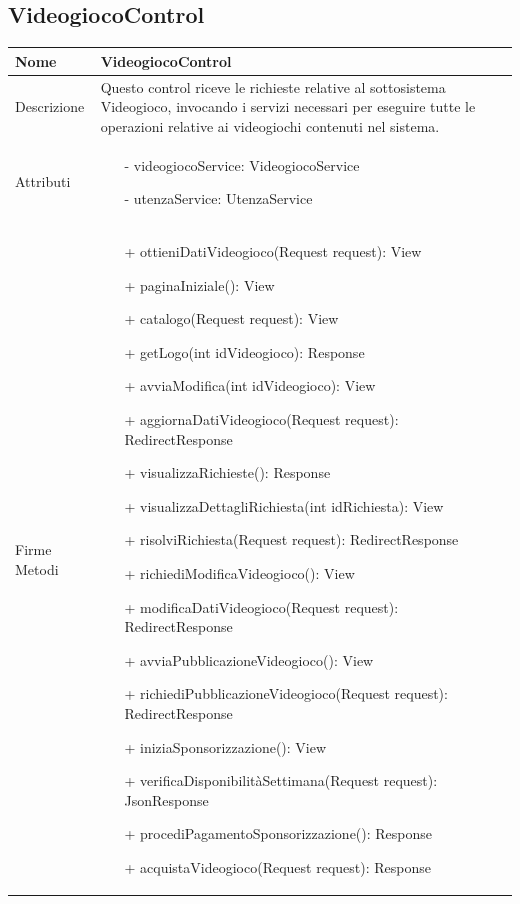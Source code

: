 \newpage
\subsection{VideogiocoControl}
\small\begin{tabular}{|| l | p{28em} ||} 
	\hline
	Nome & VideogiocoControl\\
	\hline
	Descrizione & Questo control riceve le richieste relative al sottosistema Videogioco, invocando i servizi necessari per eseguire tutte le operazioni relative ai videogiochi contenuti nel sistema. \\
	\hline
	Attributi & \begin{itemize}
		\item[-] videogiocoService: VideogiocoService
		\item[-] utenzaService: UtenzaService
	\end{itemize}\\
	\hline
	Firme Metodi & \begin{itemize}
		\item[+] ottieniDatiVideogioco(Request request): View
		\item[+] paginaIniziale(): View 
		\item[+] catalogo(Request request): View 
		\item[+] getLogo(int idVideogioco): Response
		\item[+] avviaModifica(int idVideogioco): View
		\item[+] aggiornaDatiVideogioco(Request request): RedirectResponse
		\item[+] visualizzaRichieste(): Response
		\item[+] visualizzaDettagliRichiesta(int idRichiesta): View
		\item[+] risolviRichiesta(Request request): RedirectResponse
		\item[+] richiediModificaVideogioco(): View
		\item[+] modificaDatiVideogioco(Request request): RedirectResponse
		\item[+] avviaPubblicazioneVideogioco(): View 
		\item[+] richiediPubblicazioneVideogioco(Request request): RedirectResponse
		\item[+] iniziaSponsorizzazione(): View
		\item[+] verificaDisponibilitàSettimana(Request request): JsonResponse
		\item[+] procediPagamentoSponsorizzazione(): Response
		\item[+] acquistaVideogioco(Request request): Response

\end{itemize}
\end{tabular}
